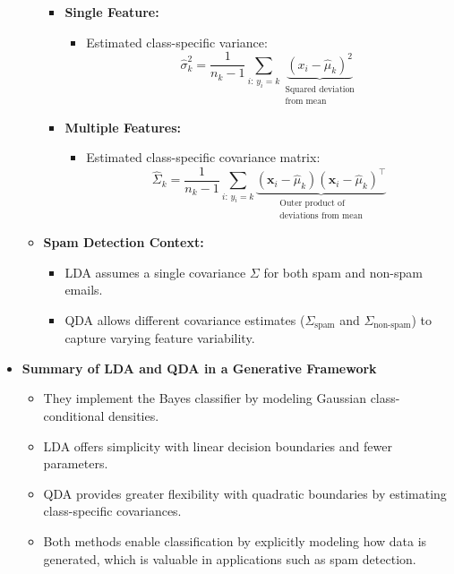 \documentclass[10pt]{article}
\begin{document}
\begin{itemize}
\begin{itemize}
        \begin{itemize}
            \item \textbf{Single Feature:}
            \begin{itemize}
                \item Estimated class-specific variance:
                \[
                \hat{\sigma}_k^2 = \frac{1}{n_k-1}\sum_{i:\,y_i=k}\underbrace{(x_i-\hat{\mu}_k)^2}_{\substack{\text{Squared deviation} \\ \text{from mean}}}
                \]
            \end{itemize}
            \item \textbf{Multiple Features:}
            \begin{itemize}
                \item Estimated class-specific covariance matrix:
                \[
                \hat{\Sigma}_k = \frac{1}{n_k-1}\sum_{i:\,y_i=k}\underbrace{(\boldsymbol{x}_i-\hat{\mu}_k)(\boldsymbol{x}_i-\hat{\mu}_k)^\top}_{\substack{\text{Outer product of} \\ \text{deviations from mean}}}
                \]
            \end{itemize}
        \end{itemize}
        \item \textbf{Spam Detection Context:}
        \begin{itemize}
            \item LDA assumes a single covariance \(\Sigma\) for both spam and non-spam emails.
            \item QDA allows different covariance estimates (\(\Sigma_{\text{spam}}\) and \(\Sigma_{\text{non-spam}}\)) to capture varying feature variability.
        \end{itemize}
    \end{itemize}
    
    \item \textbf{Summary of LDA and QDA in a Generative Framework}
    \begin{itemize}
        \item They implement the Bayes classifier by modeling Gaussian class-conditional densities.
        \item LDA offers simplicity with linear decision boundaries and fewer parameters.
        \item QDA provides greater flexibility with quadratic boundaries by estimating class-specific covariances.
        \item Both methods enable classification by explicitly modeling how data is generated, which is valuable in applications such as spam detection.
    \end{itemize}
\end{itemize}
\end{document}
